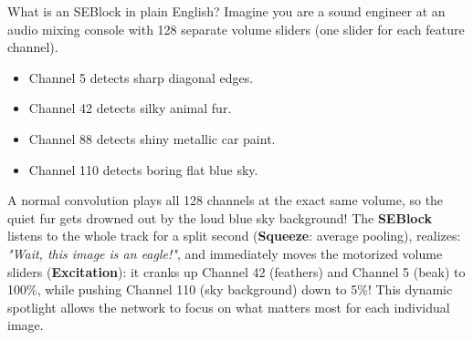 \documentclass[11pt,a4paper]{article}
\begin{document}
\begin{callout}
What is an SEBlock in plain English?\newline
Imagine you are a sound engineer at an audio mixing console with 128 separate volume sliders (one slider for each feature channel).
\begin{itemize}[noitemsep]
    \item Channel 5 detects sharp diagonal edges.
    \item Channel 42 detects silky animal fur.
    \item Channel 88 detects shiny metallic car paint.
    \item Channel 110 detects boring flat blue sky.
\end{itemize}
A normal convolution plays all 128 channels at the exact same volume, so the quiet fur gets drowned out by the loud blue sky background!\newline
The \textbf{SEBlock} listens to the whole track for a split second (\textbf{Squeeze}: average pooling), realizes: \textit{"Wait, this image is an eagle!"}, and immediately moves the motorized volume sliders (\textbf{Excitation}): it cranks up Channel 42 (feathers) and Channel 5 (beak) to 100\%, while pushing Channel 110 (sky background) down to 5\%! This dynamic spotlight allows the network to focus on what matters most for each individual image.
\end{callout}
\end{document}

